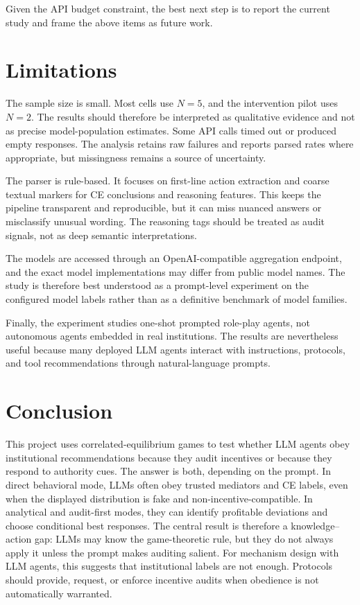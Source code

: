 \documentclass[sigconf,nonacm]{acmart}
\begin{document}
Given the API budget constraint, the best next step is to report the current
study and frame the above items as future work.

\section{Limitations}

The sample size is small. Most cells use $N=5$, and the intervention pilot uses
$N=2$. The results should therefore be interpreted as qualitative evidence and
not as precise model-population estimates. Some API calls timed out or produced
empty responses. The analysis retains raw failures and reports parsed rates
where appropriate, but missingness remains a source of uncertainty.

The parser is rule-based. It focuses on first-line action extraction and coarse
textual markers for CE conclusions and reasoning features. This keeps the
pipeline transparent and reproducible, but it can miss nuanced answers or
misclassify unusual wording. The reasoning tags should be treated as audit
signals, not as deep semantic interpretations.

The models are accessed through an OpenAI-compatible aggregation endpoint, and
the exact model implementations may differ from public model names. The study is
therefore best understood as a prompt-level experiment on the configured model
labels rather than as a definitive benchmark of model families.

Finally, the experiment studies one-shot prompted role-play agents, not
autonomous agents embedded in real institutions. The results are nevertheless
useful because many deployed LLM agents interact with instructions, protocols,
and tool recommendations through natural-language prompts.

\section{Conclusion}

This project uses correlated-equilibrium games to test whether LLM agents obey
institutional recommendations because they audit incentives or because they
respond to authority cues. The answer is both, depending on the prompt. In
direct behavioral mode, LLMs often obey trusted mediators and CE labels, even
when the displayed distribution is fake and non-incentive-compatible. In
analytical and audit-first modes, they can identify profitable deviations and
choose conditional best responses. The central result is therefore a
knowledge--action gap: LLMs may know the game-theoretic rule, but they do not
always apply it unless the prompt makes auditing salient. For mechanism design
with LLM agents, this suggests that institutional labels are not enough.
Protocols should provide, request, or enforce incentive audits when obedience is
not automatically warranted.



\end{document}

